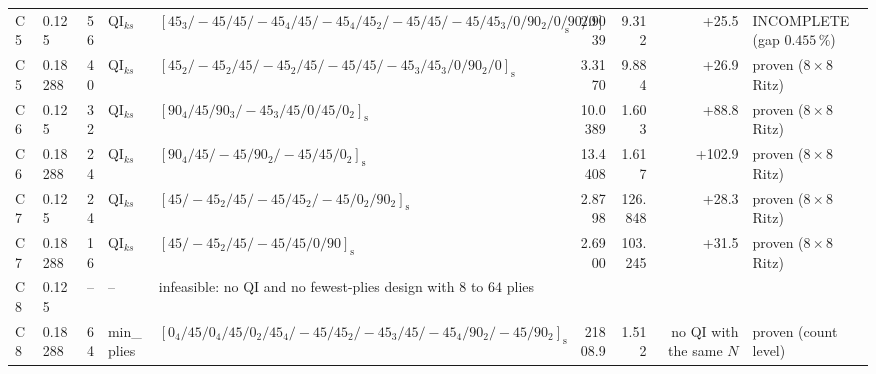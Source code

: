 \begin{table}[t]
\begin{tabular}{llrlp{62mm}rrrl}
C5 & 0.125 & 56 & QI$_{ks}$ & $[45_{3}/-45/45/-45_{4}/45/-45_{4}/45_{2}/-45/45/-45/45_{3}/0/90_{2}/0/90/0]_{\mathrm{s}}$ & 2.9039 & 9.312 & +25.5 & INCOMPLETE (gap $0.455\,\%$) \\
C5 & 0.18288 & 40 & QI$_{ks}$ & $[45_{2}/-45_{2}/45/-45_{2}/45/-45/45/-45_{3}/45_{3}/0/90_{2}/0]_{\mathrm{s}}$ & 3.3170 & 9.884 & +26.9 & proven ($8 \times 8$ Ritz) \\
C6 & 0.125 & 32 & QI$_{ks}$ & $[90_{4}/45/90_{3}/-45_{3}/45/0/45/0_{2}]_{\mathrm{s}}$ & 10.0389 & 1.603 & +88.8 & proven ($8 \times 8$ Ritz) \\
C6 & 0.18288 & 24 & QI$_{ks}$ & $[90_{4}/45/-45/90_{2}/-45/45/0_{2}]_{\mathrm{s}}$ & 13.4408 & 1.617 & +102.9 & proven ($8 \times 8$ Ritz) \\
C7 & 0.125 & 24 & QI$_{ks}$ & $[45/-45_{2}/45/-45/45_{2}/-45/0_{2}/90_{2}]_{\mathrm{s}}$ & 2.8798 & 126.848 & +28.3 & proven ($8 \times 8$ Ritz) \\
C7 & 0.18288 & 16 & QI$_{ks}$ & $[45/-45_{2}/45/-45/45/0/90]_{\mathrm{s}}$ & 2.6900 & 103.245 & +31.5 & proven ($8 \times 8$ Ritz) \\
C8 & 0.125 & -- & -- & \multicolumn{5}{l}{infeasible: no QI and no fewest-plies design with $8$ to $64$ plies} \\
C8 & 0.18288 & 64 & min\_plies & $[0_{4}/45/0_{4}/45/0_{2}/45_{4}/-45/45_{2}/-45_{3}/45/-45_{4}/90_{2}/-45/90_{2}]_{\mathrm{s}}$ & 21808.9 & 1.512 & no QI with the same $N$ & proven (count level) \\
\bottomrule
\end{tabular}
\end{table}
